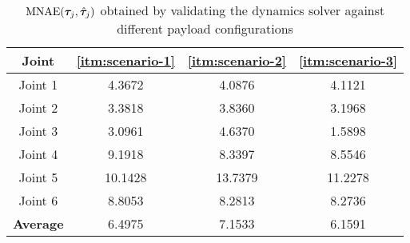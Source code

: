 \begin{table}
\centering
\caption{$\operatorname*{MNAE}(\bm \tau_j, \hat{\bm \tau}_j)$ obtained by validating the dynamics solver against different payload configurations}
\label{tab:payload}
\begin{tabular}{|c|c|c|c|} 
\hline
\textbf{Joint} & \textbf{\ref{itm:scenario-1}} & \textbf{\ref{itm:scenario-2}} & \textbf{\ref{itm:scenario-3}} \\ 
\hline
Joint 1 & 4.3672 & 4.0876 & 4.1121 \\
Joint 2 & 3.3818 & 3.8360 & 3.1968 \\
Joint 3 & 3.0961 & 4.6370 & 1.5898 \\
Joint 4 & 9.1918 & 8.3397 & 8.5546 \\
Joint 5 & 10.1428 & 13.7379 & 11.2278 \\
Joint 6 & 8.8053 & 8.2813 & 8.2736 \\ 
\hline
\textbf{Average} & 6.4975 & 7.1533 & 6.1591 \\
\hline
\end{tabular}
\end{table}
